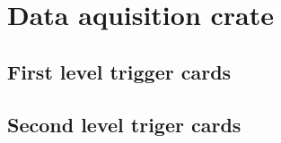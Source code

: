 
\chapter{Data aquisition crate}
\label{ch:DAQ}

  \section{First level trigger cards}
  \label{ch:DAQ:sec:FLTs}
  

  \section{Second level triger cards}
  \label{ch:DAQ:sec:SLTs}
  
